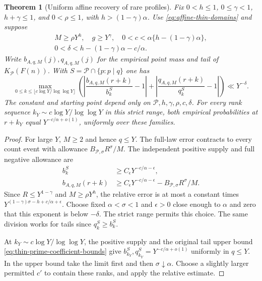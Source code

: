 \documentclass[11pt]{article}
\newtheorem{theorem}{Theorem}[section]
\theoremstyle{definition}
\begin{document}
\begin{theorem}[Uniform affine recovery of rare profiles]
\label{thm:affine-thin-rare-recovery}
Fix $0<h\le1$, $0\le\gamma<1$, $h+\gamma\le1$,
and $0<\rho\le1$, with $h>(1-\gamma)\alpha$.
Use \eqref{eq:affine-thin-domains} and suppose
\begin{equation}
 \begin{gathered}
 M\ge\rho Y^h,\quad g\ge Y^\gamma,\quad
 0<c<\alpha\{h-(1-\gamma)\alpha\},\\
 0<\delta<h-(1-\gamma)\alpha-c/\alpha .
 \end{gathered}
 \label{eq:affine-thin-rare-range}
\end{equation}
Write $b_{A,q,M}(j),q_{A,q,M}(j)$ for the empirical point
mass and tail of $K_{\mathcal P}(F(n))$.
With $S=\mathcal P\cap\{p:p\mid q\}$ one has
\begin{equation}
 \max_{0\le k\le\lfloor c\log Y/\log\log Y\rfloor}
 \left(
 \left|\frac{b_{A,q,M}(r+k)}{b_k^S}-1\right|
 +\left|\frac{q_{A,q,M}(r+k)}{q_k^S}-1\right|
 \right)\ll Y^{-\delta}.
 \label{eq:affine-thin-relative-recovery}
\end{equation}
The constant and starting point depend only on
$\mathcal P,h,\gamma,\rho,c,\delta$.
For every rank sequence $k_Y\sim c\log Y/\log\log Y$
in this strict range, both empirical probabilities at $r+k_Y$
equal $Y^{-c/\alpha+o(1)}$, uniformly over these families.
\end{theorem}

\begin{proof}
For large $Y$, $M\ge2$ and hence $q\le Y$.
The full-law error contracts to every count event with allowance
$B_{\mathcal P,\sigma}R^\sigma/M$.
The independent positive supply and full negative allowance are
\begin{equation}
 \begin{aligned}
 b_k^S&\ge C_\epsilon Y^{-c/\alpha-\epsilon},\\
 b_{A,q,M}(r+k)&\ge C_\epsilon Y^{-c/\alpha-\epsilon}
                      -B_{\mathcal P,\sigma}R^\sigma/M .
 \end{aligned}
 \label{eq:affine-thin-signed-consumer}
\end{equation}
Since $R\le Y^{1-\gamma}$ and $M\ge\rho Y^h$,
the relative error is at most a constant times
$Y^{(1-\gamma)\sigma-h+c/\alpha+\epsilon}$.
Choose fixed $\alpha<\sigma<1$ and $\epsilon>0$ close
enough to $\alpha$ and zero that this exponent is below $-\delta$.
The strict range permits this choice.
The same division works for tails since $q_k^S\ge b_k^S$.

At $k_Y\sim c\log Y/\log\log Y$, the positive supply and
the original tail upper bound
\eqref{eq:thin-prime-coefficient-bounds} give
$b_{k_Y}^S,q_{k_Y}^S=Y^{-c/\alpha+o(1)}$ uniformly in $q\le Y$.
In the upper bound take the limit first and then
$\sigma\downarrow\alpha$.
Choose a slightly larger permitted $c'$ to contain these ranks,
and apply the relative estimate.
\end{proof}
\end{document}
